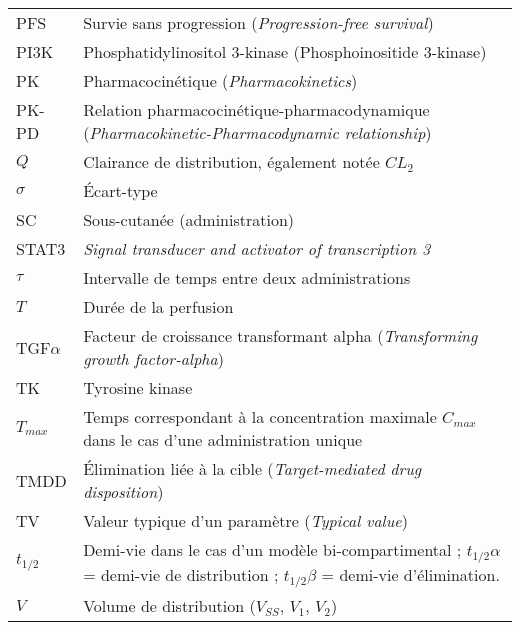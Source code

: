 \begin{tabularx}{30em}{X X}
PFS & 	Survie sans progression (\textit{Progression-free survival})\\
PI3K & 	Phosphatidylinositol 3-kinase (Phosphoinositide 3-kinase)\\
PK & 	Pharmacocinétique (\textit{Pharmacokinetics})\\
PK-PD & 	Relation pharmacocinétique-pharmacodynamique (\textit{Pharmacokinetic-Pharmacodynamic relationship})\\
$Q$ & 	Clairance de distribution, également notée $CL_2$\\
$\sigma$ & 	Écart-type\\
SC & 	Sous-cutanée (administration)\\
STAT3 & 	\textit{Signal transducer and activator of transcription 3}\\
$\tau$ & 	Intervalle de temps entre deux administrations\\
$T$ & 	Durée de la perfusion\\
TGF$\alpha$ & 	Facteur de croissance transformant alpha (\textit{Transforming growth factor-alpha})\\
TK & 	Tyrosine kinase \\
$T_{max}$ & 	Temps correspondant à la concentration maximale $C_{max}$ dans le cas d'une administration unique\\
TMDD & 	Élimination liée à la cible (\textit{Target-mediated drug disposition})\\
TV & 	Valeur typique d'un paramètre (\textit{Typical value})\\
$t_{1/2}$ & 	Demi-vie dans le cas d'un modèle bi-compartimental ; $t_{1/2}\alpha$ = demi-vie de distribution ; $t_{1/2}\beta$ = demi-vie d'élimination.\\
$V$ & 	Volume de distribution ($V_{SS}$, $V_1$, $V_2$)\\
\end{tabularx}
